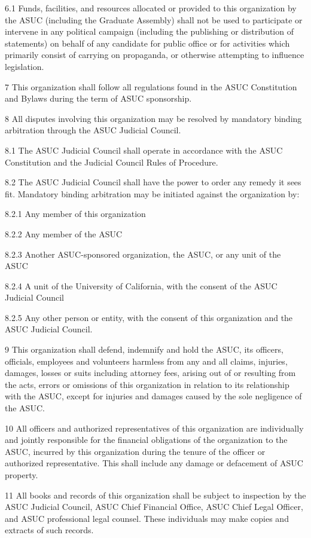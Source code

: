 \documentclass[11pt]{article}
\begin{document}
6.1 Funds, facilities, and resources allocated or provided to this organization by the ASUC (including the Graduate Assembly) shall not be used to participate or intervene in any political campaign (including the publishing or distribution of statements) on behalf of any candidate for public office or for activities which primarily consist of carrying on propaganda, or otherwise attempting to influence legislation.

7 This organization shall follow all regulations found in the ASUC Constitution and Bylaws during the term of ASUC sponsorship.

8 All disputes involving this organization may be resolved by mandatory binding arbitration through the ASUC Judicial Council.

8.1 The ASUC Judicial Council shall operate in accordance with the ASUC Constitution and the Judicial Council Rules of Procedure.

8.2 The ASUC Judicial Council shall have the power to order any remedy it sees fit.
Mandatory binding arbitration may be initiated against the organization by:

8.2.1 Any member of this organization

8.2.2 Any member of the ASUC

8.2.3 Another ASUC-sponsored organization, the ASUC, or any unit of the ASUC

8.2.4 A unit of the University of California, with the consent of the ASUC Judicial Council

8.2.5 Any other person or entity, with the consent of this organization and the ASUC Judicial Council.

9 This organization shall defend, indemnify and hold the ASUC, its officers, officials, employees and volunteers harmless from any and all claims, injuries, damages, losses or suits including attorney fees, arising out of or resulting from the acts, errors or omissions of this organization in relation to its relationship with the ASUC, except for injuries and damages caused by the sole negligence of the ASUC.

10 All officers and authorized representatives of this organization are individually and jointly responsible for the financial obligations of the organization to the ASUC, incurred by this organization during the tenure of the officer or authorized representative.
This shall include any damage or defacement of ASUC property.

11 All books and records of this organization shall be subject to inspection by the ASUC Judicial Council, ASUC Chief Financial Office, ASUC Chief Legal Officer, and ASUC professional legal counsel.
These individuals may make copies and extracts of such records.
\end{document}
